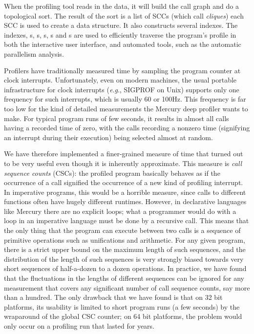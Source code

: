 \noindent
When the profiling tool reads in the data,
it will build the call graph and do a topological sort.
The result of the sort is a list of SCCs
(which \citet{conway:2001:mercury-deep} call \emph{cliques})
each SCC is used to create a \Clique data structure.
It also constructs several indexes.
The indexes, {\Clique}s, {\PS}s, {\PD}s, {\CSS}s and {\CSD}s are used to
efficiently traverse the program's profile in both
the interactive user interface,
and automated tools, such as the automatic parallelism analysis.

Profilers have traditionally measured time
by sampling the program counter at clock interrupts.
Unfortunately, even on modern machines,
the usual portable infrastructure for clock interrupts
(\emph{e.g}., SIGPROF on Unix)
supports only one frequency for such interrupts,
which is usually 60 or 100Hz.
This frequency is far too low for the kind of detailed measurements
the Mercury deep profiler wants to make.
For typical program runs of few seconds,
it results in almost all calls having a recorded time of zero,
with the calls recording a nonzero time
(signifying an interrupt during their execution)
being selected almost at random.

We have therefore implemented a finer-grained measure of time
that turned out to be very useful
even though it is inherently approximate.
This measure is \emph{call sequence counts} (CSCs):
the profiled program basically behaves
as if the occurrence of a call signified
the occurrence of a new kind of profiling interrupt.
In imperative programs, this would be a horrible measure,
since calls to different functions often have hugely different runtimes.
However, in declarative languages like Mercury there are no explicit loops;
what a programmer would do with a loop in an imperative language
must be done by a recursive call.
This means that the only thing that the program can execute between two calls
is a sequence of primitive operations such as unifications and arithmetic.
For any given program,
there is a strict upper bound on the maximum length of such sequences,
and the distribution of the length of such sequences
is very strongly biased towards very short sequences
of half-a-dozen to a dozen operations.
In practice, we have found that
the fluctuations in the lengths of different sequences
can be ignored for any measurement
that covers any significant number of call sequence counts,
say more than a hundred.
The only drawback that we have found is that on 32 bit platforms,
its usability is limited to short program runs (a few seconds)
by the wraparound of the global CSC counter;
on 64 bit platforms, the problem would only occur
on a profiling run that lasted for years.

